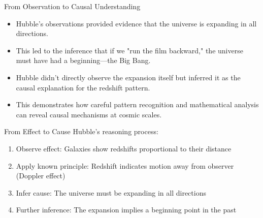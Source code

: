 \documentclass{beamer}
\begin{document}
\begin{frame}{From Observation to Causal Understanding}
    \begin{itemize}
        \item Hubble's observations provided evidence that the universe is expanding in all directions.
        \item This led to the inference that if we "run the film backward," the universe must have had a beginning—the Big Bang.
        \item Hubble didn't directly observe the expansion itself but inferred it as the causal explanation for the redshift pattern.
        \item This demonstrates how careful pattern recognition and mathematical analysis can reveal causal mechanisms at cosmic scales.
    \end{itemize}
    
    \begin{block}{From Effect to Cause}
        Hubble's reasoning process:
        \begin{enumerate}
            \item Observe effect: Galaxies show redshifts proportional to their distance
            \item Apply known principle: Redshift indicates motion away from observer (Doppler effect)
            \item Infer cause: The universe must be expanding in all directions
            \item Further inference: The expansion implies a beginning point in the past
        \end{enumerate}
    \end{block}
\end{frame}
\end{document}
